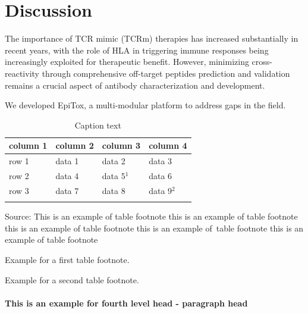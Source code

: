 \documentclass[unnumsec,webpdf,contemporary,large]{oup-authoring-template}%
\theoremstyle{thmstyleone}%
\theoremstyle{thmstyletwo}%
\theoremstyle{thmstylethree}%
\begin{document}
\section{Discussion}
    The importance of TCR mimic (TCRm) therapies has increased substantially in recent years, with the role of HLA in triggering immune responses being increasingly exploited for therapeutic benefit. However, minimizing cross-reactivity through comprehensive off-target peptides prediction and validation remains a crucial aspect of antibody characterization and development.

    We developed EpiTox, a multi-modular platform to address gaps in the field. 


    \begin{table}[!t]
        \caption{Caption text\label{tools_summary}}%
        \begin{tabular*}{\columnwidth}{@{\extracolsep\fill}llll@{\extracolsep\fill}}
            \toprule
            column 1 & column 2  & column 3 & column 4\\
            \midrule
            row 1    & data 1   & data 2  & data 3  \\
            row 2    & data 4   & data 5$^{1}$  & data 6  \\
            row 3    & data 7   & data 8  & data 9$^{2}$  \\
            \botrule
        \end{tabular*}
        \begin{tablenotes}%
            \item Source: This is an example of table footnote this is an example of table footnote this is an example of table footnote this is an example of~table footnote this is an example of table footnote
            \item[$^{1}$] Example for a first table footnote.
            \item[$^{2}$] Example for a second table footnote.
        \end{tablenotes}
    \end{table}


\paragraph{This is an example for fourth level head - paragraph head}
\end{document}
